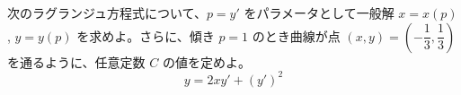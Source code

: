 
次のラグランジュ方程式について、$p = y'$ をパラメータとして一般解 $x = x(p)$, $y = y(p)$ を求めよ。さらに、傾き $p = 1$ のとき曲線が点 $\left(x, y\right) = \left(-\dfrac{1}{3}, \dfrac{1}{3}\right)$ を通るように、任意定数 $C$ の値を定めよ。
\[
y = 2xy' + (y')^{2}
\]
